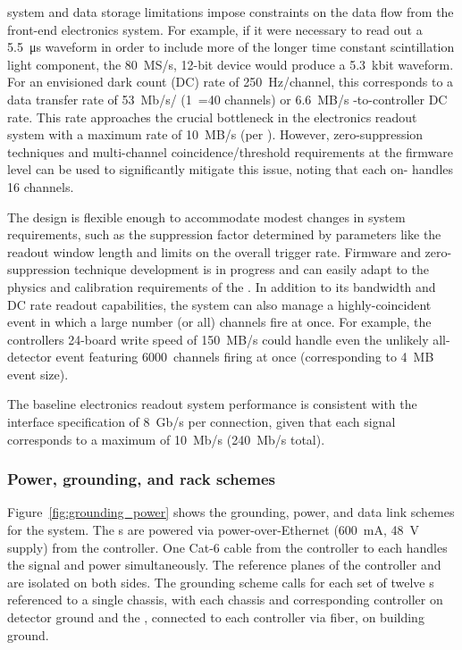  system and data storage limitations impose constraints on the  data flow from the front-end electronics system. 
For example, if it were necessary to read out a \SI{5.5}{\micro\second} waveform in order to include more of the longer time constant scintillation light component, the \SI{80}{MS/s}, 12-bit  device would produce a 5.3~kbit waveform. For an envisioned dark count (DC) rate of 250~Hz/channel, this corresponds to a data transfer rate of \SI{53}{Mb/s}/ (1~=40 channels) or \SI{6.6}{MB/s} -to-controller DC rate. This rate approaches the crucial bottleneck in the electronics readout system with a maximum rate of \SI{10}{MB/s} (per ). However, zero-suppression techniques and multi-channel coincidence/threshold requirements at the  firmware level can be used to significantly mitigate this issue, noting that each on-  handles 16 channels. 

The design is flexible enough to accommodate modest changes in system requirements, such as the suppression factor determined by parameters like the readout window length and limits on the overall trigger rate. 
Firmware and zero-suppression technique development is in progress and can easily adapt to the physics and calibration requirements of the .
In addition to its bandwidth and DC rate readout capabilities, the system can also  manage a highly-coincident event in which a large number (or all) channels fire at once. %
For example, the controllers 24-board write speed of \SI{150}{MB/s} could handle even the unlikely all-detector event featuring 6000~channels firing at once (corresponding to \SI{4}{MB} event size). 

The baseline electronics readout system performance is consistent with the  interface specification of \SI{8}{Gb/s} per connection, given that
each  signal corresponds to a maximum of \SI{10}{Mb/s} (\SI{240}{Mb/s} total).  

\subsubsection{Power, grounding, and rack schemes} 

Figure~\ref{fig:grounding_power} shows the grounding, power, and data link schemes for the system. The s are powered via power-over-Ethernet (\SI{600}{mA}, \SI{48}{V} supply) from the controller. One Cat-6 cable from the controller to each  handles the signal and power simultaneously. The reference planes of the controller and  are isolated on both sides. The grounding scheme calls for each set of twelve s referenced to a single chassis, with each chassis and corresponding controller on detector ground and the , connected to each controller via fiber, on building ground. 
 
